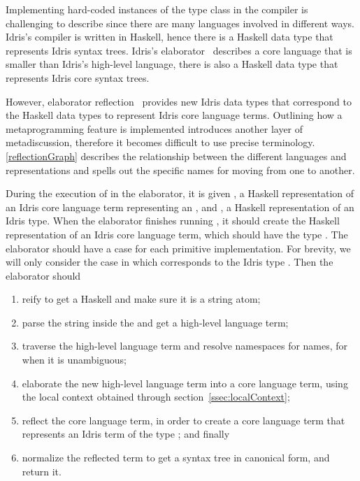 Implementing hard-coded instances of the \Editorable{} type class in the
compiler is challenging to describe since there are many languages involved in
different ways. Idris's compiler is written in Haskell, hence there is a
Haskell data type that represents Idris syntax trees. Idris's
elaborator~\citep{idris} describes a core language that is smaller than Idris's
high-level language, there is also a Haskell data type that represents Idris
core syntax trees.

However, elaborator reflection~\citep{davidphd, elabref} provides new Idris
data types that correspond to the Haskell data types to represent Idris core
language terms.
Outlining how a metaprogramming feature is implemented introduces another layer of metadiscussion,
therefore it becomes difficult to use precise terminology.
\autoref{reflectionGraph} describes the relationship between the different
languages and representations and spells out the specific names for moving
from one to another.

During the execution of  in the elaborator, it is given
, a Haskell representation of an Idris core language term representing
an \sexp{}, and , a Haskell representation of an Idris type.
When the elaborator finishes running , it should create
the Haskell representation of an Idris core language term, which should have the
type . The elaborator should have a case for each primitive
\Editorable{} implementation. For brevity, we will only consider the case in
which  corresponds to the Idris type \TT{}. Then the elaborator should

\begin{enumerate}
  \item reify  to get a Haskell \sexp{} and make sure it is a string atom;
  \item parse the string inside the \sexp{} and get a high-level language term;
  \item traverse the high-level language term and resolve namespaces for names, for when it is unambiguous;
  \item elaborate the new high-level language term into a core language term, using the local context obtained through section~\ref{ssec:localContext};
  \item reflect the core language term, in order to create a core language term that represents an Idris term of the type \TT{}; and finally
  \item normalize the reflected term to get a syntax tree in canonical form, and return it.
\end{enumerate}

